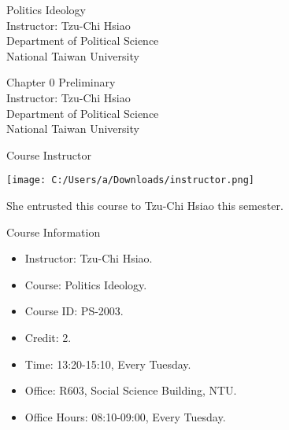 \documentclass{beamer}
\title{}
\author{}
\date{}
\begin{document}
\begin{frame}
\begin{center}
\Large{Politics Ideology} \\
\vspace{3em}
\normalsize{Instructor: Tzu-Chi Hsiao} \\
\vspace{3em}
\small{Department of Political Science} \\
\vspace{1em}
\small{National Taiwan University}
\end{center}
\end{frame}
\begin{frame}
\begin{center}
\Large{Chapter 0 Preliminary} \\
\vspace{3em}
\normalsize{Instructor: Tzu-Chi Hsiao} \\
\vspace{3em}
\small{Department of Political Science} \\
\vspace{1em}
\small{National Taiwan University} \\
\end{center}
\end{frame}
\begin{frame}{Course Instructor}
\begin{center}
\texttt{[image: C:/Users/a/Downloads/instructor.png]}
\end{center}
\begin{center}
She entrusted this course to Tzu-Chi Hsiao this semester.
\end{center}
\end{frame}
\begin{frame}{Course Information}
\begin{itemize}
\pause
\item Instructor: Tzu-Chi Hsiao.
\pause
\item Course: Politics Ideology.
\pause
\item Course ID: PS-2003.
\pause
\item Credit: 2.
\pause
\item Time: 13:20-15:10, Every Tuesday.
\pause
\item Office: R603, Social Science Building, NTU.
\pause
\item Office Hours: 08:10-09:00, Every Tuesday.
\end{itemize}
\end{frame}
\end{document}
